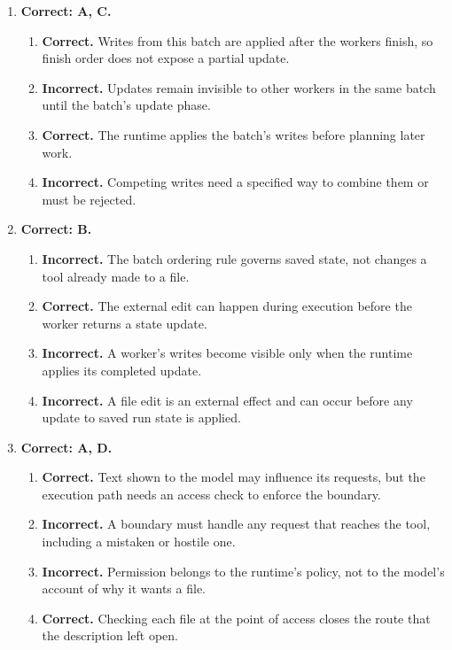 \begin{enumerate}[start=31,itemsep=0.7\baselineskip]
\item[{\hyperref[exercise:31]{31.}}] \begin{minipage}[t]{\linewidth}
\textbf{Correct: A, C.}
\begin{enumerate}[label=\textnormal{(\Alph*)},leftmargin=*,itemsep=0pt]
\item \textbf{Correct.} Writes from this batch are applied after the workers finish, so finish order does not expose a partial update.
\item \textbf{Incorrect.} Updates remain invisible to other workers in the same batch until the batch's update phase.
\item \textbf{Correct.} The runtime applies the batch's writes before planning later work.
\item \textbf{Incorrect.} Competing writes need a specified way to combine them or must be rejected.
\end{enumerate}
\end{minipage}

\item[{\hyperref[exercise:32]{32.}}] \begin{minipage}[t]{\linewidth}
\textbf{Correct: B.}
\begin{enumerate}[label=\textnormal{(\Alph*)},leftmargin=*,itemsep=0pt]
\item \textbf{Incorrect.} The batch ordering rule governs saved state, not changes a tool already made to a file.
\item \textbf{Correct.} The external edit can happen during execution before the worker returns a state update.
\item \textbf{Incorrect.} A worker's writes become visible only when the runtime applies its completed update.
\item \textbf{Incorrect.} A file edit is an external effect and can occur before any update to saved run state is applied.
\end{enumerate}
\end{minipage}

\item[{\hyperref[exercise:33]{33.}}] \begin{minipage}[t]{\linewidth}
\textbf{Correct: A, D.}
\begin{enumerate}[label=\textnormal{(\Alph*)},leftmargin=*,itemsep=0pt]
\item \textbf{Correct.} Text shown to the model may influence its requests, but the execution path needs an access check to enforce the boundary.
\item \textbf{Incorrect.} A boundary must handle any request that reaches the tool, including a mistaken or hostile one.
\item \textbf{Incorrect.} Permission belongs to the runtime's policy, not to the model's account of why it wants a file.
\item \textbf{Correct.} Checking each file at the point of access closes the route that the description left open.
\end{enumerate}
\end{minipage}


\end{enumerate}
